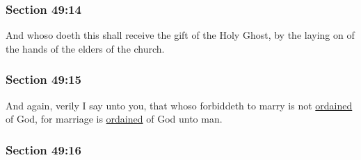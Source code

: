 
	\subsubsection{Section 49:14} %
		\label{DC49-14}

		And whoso doeth this shall receive the gift of the Holy Ghost, by the laying on of the hands of the elders of the church.


	\subsubsection{Section 49:15} %
		\label{DC49-15}

		And again, verily I say unto you, that whoso forbiddeth to marry is not \hyperref[ORDINATION]{ordained} of God, for marriage is \hyperref[ORDINATION]{ordained} of God unto man.


	\subsubsection{Section 49:16} %
		\label{DC49-16}

